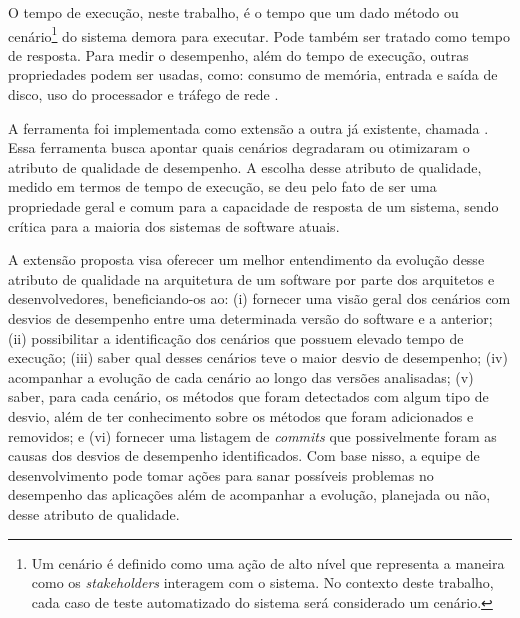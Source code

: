 O tempo de execução, neste trabalho, é o tempo que um dado método ou cenário\footnote{Um cenário é definido como uma ação de alto nível que representa a maneira como os \textit{stakeholders} interagem com o sistema. No contexto deste trabalho, cada caso de teste automatizado do sistema será considerado um cenário.} do sistema demora para executar. Pode também ser tratado como tempo de resposta. Para medir o desempenho, além do tempo de execução, outras propriedades podem ser usadas, como: consumo de memória, entrada e saída de disco, uso do processador e tráfego de rede \cite{Malik2013}.


A ferramenta foi implementada como extensão a outra já existente, chamada \textit{\perfMinerName} \cite{Pinto2015}. Essa ferramenta busca apontar quais cenários degradaram ou otimizaram o atributo de qualidade de desempenho. A escolha desse atributo de qualidade, medido em termos de tempo de execução, se deu pelo fato de ser uma propriedade geral e comum para a capacidade de resposta de um sistema, sendo crítica para a maioria dos sistemas de software atuais.

A extensão proposta visa oferecer um melhor entendimento da evolução desse atributo de qualidade na arquitetura de um software por parte dos arquitetos e desenvolvedores, beneficiando-os ao: (i) fornecer uma visão geral dos cenários com desvios de desempenho entre uma determinada versão do software e a anterior; (ii) possibilitar a identificação dos cenários que possuem elevado tempo de execução; (iii) saber qual desses cenários teve o maior desvio de desempenho; (iv) acompanhar a evolução de cada cenário ao longo das versões analisadas; (v) saber, para cada cenário, os métodos que foram detectados com algum tipo de desvio, além de ter conhecimento sobre os métodos que foram adicionados e removidos; e (vi) fornecer uma listagem de \textit{commits} que possivelmente foram as causas dos desvios de desempenho identificados. Com base nisso, a equipe de desenvolvimento pode tomar ações para sanar possíveis problemas no desempenho das aplicações além de acompanhar a evolução, planejada ou não, desse atributo de qualidade.


